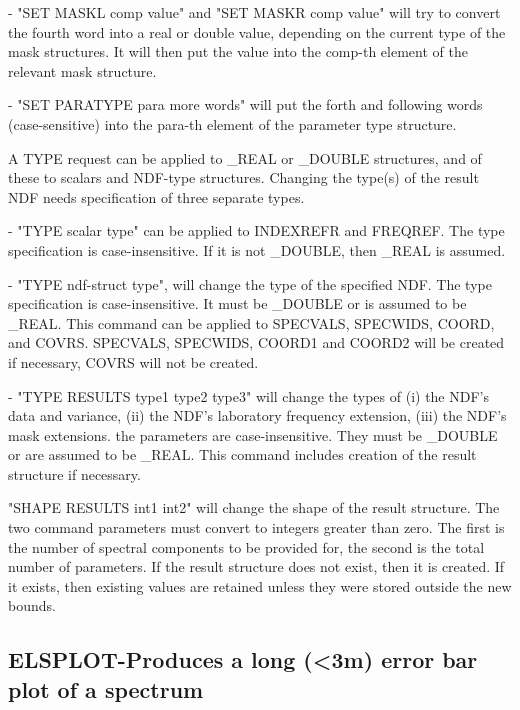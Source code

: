 \begin{description}
\begin{description}
   -  "SET MASKL comp value" and "SET MASKR comp value" will try
      to convert the fourth word into a real or double value,
      depending on the current type of the mask structures. It
      will then put the value into the comp-th element of the
      relevant mask structure.

   -  "SET PARATYPE para more words" will put the forth and
      following words (case-sensitive) into the para-th element
      of the parameter type structure.

   A TYPE request can be applied to \_REAL or \_DOUBLE structures,
   and of these to scalars and NDF-type structures. Changing the
   type(s) of the result NDF needs specification of three separate
   types.

   -  "TYPE scalar type" can be applied to INDEXREFR and FREQREF.
      The type specification is case-insensitive. If it is not
      \_DOUBLE, then \_REAL is assumed.

   -  "TYPE ndf-struct type", will change the type of the
      specified NDF. The type specification is case-insensitive. It
      must be \_DOUBLE or is assumed to be \_REAL. This command can
      be applied to SPECVALS, SPECWIDS, COORD, and COVRS. SPECVALS,
      SPECWIDS, COORD1 and COORD2 will be created if necessary,
      COVRS will not be created.

   -  "TYPE RESULTS type1 type2 type3" will change the types of
      (i) the NDF's data and variance, (ii) the NDF's laboratory
      frequency extension, (iii) the NDF's mask extensions. the
      parameters are case-insensitive. They must be \_DOUBLE or are
      assumed to be \_REAL. This command includes creation of the
      result structure if necessary.

   "SHAPE RESULTS int1 int2" will change the shape of the result
   structure. The two command parameters must convert to integers
   greater than zero. The first is the number of spectral
   components to be provided for, the second is the total number
   of parameters. If the result structure does not exist, then it
   is created. If it exists, then existing values are retained
   unless they were stored outside the new bounds.
\end{description}
\subsection{ELSPLOT-\label{ELSPLOT}Produces a long (<3m) error bar plot of a spectrum}
\begin{description}


\end{description}
\end{description}
